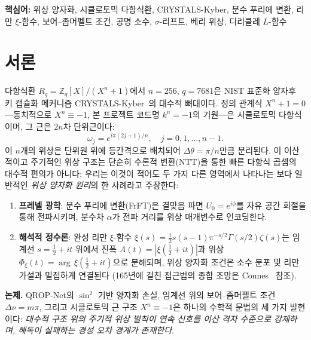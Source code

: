 \documentclass[11pt, a4paper]{article}
\theoremstyle{definition}
\theoremstyle{plain}
\newcommand{\Rq}{\mathbb{Z}_q[X]/(X^n+1)}
\newcommand{\xif}{\xi}
\newcommand{\Phiz}{\Phi_\xi}
\newcommand{\Ampl}{A}
\begin{document}
\vspace{0.5em}
\noindent\textbf{핵심어:} 위상 양자화, 시클로토믹 다항식환, CRYSTALS-Kyber,
분수 푸리에 변환, 리만 $\xif$-함수, 보어--좀머펠트 조건, 공명 소수,
$\sigma$-리프트, 베리 위상, 디리클레 $L$-함수

\tableofcontents
\newpage


\section{서론}
\label{sec:intro}

다항식환 $R_q = \Rq$에서 $n = 256$, $q = 7681$은 NIST 표준화 양자후 키 캡슐화 메커니즘 CRYSTALS-Kyber~\cite{kyber2021}의 대수적 뼈대이다. 정의 관계식 $X^n + 1 = 0$---동치적으로 $X^n \equiv -1$, 본 프로젝트 코드명 $k^n = -1$의 기원---은 시클로토믹 다항식이며, 그 근은 $2n$차 단위근이다:
\begin{equation}
  \omega_j = e^{i\pi(2j+1)/n}, \quad j = 0, 1, \ldots, n-1.
  \label{eq:cyclo_roots}
\end{equation}
이 $n$개의 위상은 단위원 위에 등간격으로 배치되어 $\Delta\theta = \pi/n$만큼 분리된다. 이 이산적이고 주기적인 위상 구조는 단순히 수론적 변환(NTT)을 통한 빠른 다항식 곱셈의 대수적 편의가 아니다; 우리는 이것이 적어도 두 가지 다른 영역에서 나타나는 보다 일반적인 \textit{위상 양자화 원리}의 한 사례라고 주장한다:

\begin{enumerate}
  \item \textbf{프레넬 광학}: 분수 푸리에 변환(FrFT)은 결맞음 파면 $U_0 = e^{i\phi}$를 자유 공간 회절을 통해 전파시키며, 분수차 $\alpha$가 전파 거리를 위상 매개변수로 인코딩한다.
  \item \textbf{해석적 정수론}: 완성 리만 $\xif$-함수 $\xif(s) = \tfrac{1}{2}s(s-1)\pi^{-s/2}\Gamma(s/2)\zeta(s)$는 임계선 $s = \tfrac{1}{2} + it$ 위에서 진폭 $\Ampl(t) = |\xif(\tfrac{1}{2}+it)|$과 위상 $\Phiz(t) = \arg\,\xif(\tfrac{1}{2}+it)$으로 분해되며, 위상 양자화 조건은 소수 분포 및 리만 가설과 밀접하게 연결된다 (165년에 걸친 접근법의 종합 조망은 Connes~\cite{Connes2026RHSurvey} 참조).
\end{enumerate}

\textbf{논제.} QROP-Net의 $\sin^2$ 기반 양자화 손실, 임계선 위의 보어--좀머펠트 조건 $\Delta\nu = m\pi$, 그리고 시클로토믹 근 구조 $X^n \equiv -1$은 하나의 수학적 문법의 세 가지 발현이다: \textit{대수적 구조 위의 주기적 위상 벌칙이 연속 신호를 이산 격자 수준으로 강제하며, 해독이 실패하는 경성 오차 경계가 존재한다}.
\end{document}
